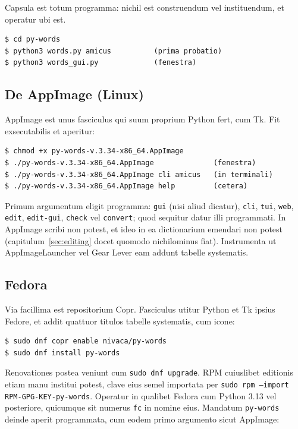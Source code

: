 \documentclass[12pt,
              article,
              oneside
              ]{memoir}
\begin{document}
\noindent
Capsula est totum programma: nichil est construendum vel instituendum,
et operatur ubi est.

\begin{verbatim}
$ cd py-words
$ python3 words.py amicus          (prima probatio)
$ python3 words_gui.py             (fenestra)
\end{verbatim}

\subsection{De AppImage (Linux)}

%
AppImage est unus fasciculus qui suum proprium Python fert, cum Tk. Fit
exsecutabilis et aperitur:

\begin{verbatim}
$ chmod +x py-words-v.3.34-x86_64.AppImage
$ ./py-words-v.3.34-x86_64.AppImage              (fenestra)
$ ./py-words-v.3.34-x86_64.AppImage cli amicus   (in terminali)
$ ./py-words-v.3.34-x86_64.AppImage help         (cetera)
\end{verbatim}

\noindent{}%
Primum argumentum eligit programma: \texttt{gui} (nisi aliud dicatur),
\texttt{cli}, \texttt{tui}, \texttt{web}, \texttt{edit},
\texttt{edit-gui}, \texttt{check} vel \texttt{convert}; quod sequitur
datur illi programmati. In AppImage scribi non potest, et ideo in ea
dictionarium emendari non potest (capitulum~\ref{sec:editing} docet
quomodo nichilominus fiat). Instrumenta ut AppImageLauncher vel Gear
Lever eam addunt tabelle systematis.

\subsection{Fedora}

%
Via facillima est repositorium Copr. Fasciculus utitur Python et Tk
ipsius Fedore, et addit quattuor titulos tabelle systematis, cum icone:

\begin{verbatim}
$ sudo dnf copr enable nivaca/py-words
$ sudo dnf install py-words
\end{verbatim}

\noindent
Renovationes postea veniunt cum \texttt{sudo dnf upgrade}. RPM cuiuslibet
editionis etiam manu institui potest, clave eius semel importata per
\texttt{sudo rpm --import RPM-GPG-KEY-py-words}. Operatur in qualibet
Fedora cum Python 3.13 vel posteriore, quicumque sit numerus
\texttt{fc} in nomine eius. Mandatum \texttt{py-words} deinde aperit
programmata, cum eodem primo argumento sicut AppImage:
\end{document}
